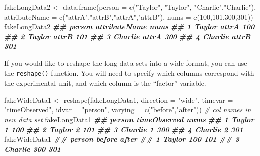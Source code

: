 \documentclass[
  12pt,
  krantz2]{krantz}
\makeatletter
\newenvironment{Shaded}{\begin{snugshade}}{\end{snugshade}}
\newcommand{\AttributeTok}[1]{\textcolor[rgb]{0.61,0.61,0.61}{#1}}
\newcommand{\CommentTok}[1]{\textcolor[rgb]{0.37,0.37,0.37}{\textit{#1}}}
\newcommand{\DecValTok}[1]{\textcolor[rgb]{0.06,0.06,0.06}{#1}}
\newcommand{\DocumentationTok}[1]{\textcolor[rgb]{0.37,0.37,0.37}{\textbf{\textit{#1}}}}
\newcommand{\FunctionTok}[1]{\textcolor[rgb]{0,0,0}{#1}}
\newcommand{\NormalTok}[1]{#1}
\newcommand{\OtherTok}[1]{\textcolor[rgb]{0.37,0.37,0.37}{#1}}
\newcommand{\StringTok}[1]{\textcolor[rgb]{0.5,0.5,0.5}{#1}}
\newenvironment{kframe}{%
\medskip{}
\setlength{\fboxsep}{.8em}
 \def\at@end@of@kframe{}%
 \ifinner\ifhmode%
  \def\at@end@of@kframe{\end{minipage}}%
  \begin{minipage}{\columnwidth}%
 \fi\fi%
 \def\FrameCommand##1{\hskip\@totalleftmargin \hskip-\fboxsep
 \colorbox{shadecolor}{##1}\hskip-\fboxsep
     \hskip-\linewidth \hskip-\@totalleftmargin \hskip\columnwidth}%
 \MakeFramed {\advance\hsize-\width
   \@totalleftmargin\z@ \linewidth\hsize
   \@setminipage}}%
 {\par\unskip\endMakeFramed%
 \at@end@of@kframe}
\renewenvironment{Shaded}{\begin{kframe}}{\end{kframe}}
\makeatother
\begin{document}
\begin{Shaded}
\begin{Highlighting}[]
\NormalTok{fakeLongData2 }\OtherTok{\textless{}{-}} \FunctionTok{data.frame}\NormalTok{(}\AttributeTok{person =} \FunctionTok{c}\NormalTok{(}\StringTok{"Taylor"}\NormalTok{, }\StringTok{"Taylor"}\NormalTok{, }\StringTok{"Charlie"}\NormalTok{,}\StringTok{"Charlie"}\NormalTok{), }
                             \AttributeTok{attributeName =} \FunctionTok{c}\NormalTok{(}\StringTok{"attrA"}\NormalTok{,}\StringTok{"attrB"}\NormalTok{,}\StringTok{"attrA"}\NormalTok{,}\StringTok{"attrB"}\NormalTok{),}
                             \AttributeTok{nums =} \FunctionTok{c}\NormalTok{(}\DecValTok{100}\NormalTok{,}\DecValTok{101}\NormalTok{,}\DecValTok{300}\NormalTok{,}\DecValTok{301}\NormalTok{))}
\NormalTok{fakeLongData2}
\DocumentationTok{\#\#    person attributeName nums}
\DocumentationTok{\#\# 1  Taylor         attrA  100}
\DocumentationTok{\#\# 2  Taylor         attrB  101}
\DocumentationTok{\#\# 3 Charlie         attrA  300}
\DocumentationTok{\#\# 4 Charlie         attrB  301}
\end{Highlighting}
\end{Shaded}

If you would like to reshape the long data sets into a wide format, you can use the \texttt{reshape()} function. You will need to specify which columns correspond with the experimental unit, and which column is the ``factor'' variable.

\begin{Shaded}
\begin{Highlighting}[]
\NormalTok{fakeWideData1 }\OtherTok{\textless{}{-}} \FunctionTok{reshape}\NormalTok{(fakeLongData1, }
                           \AttributeTok{direction =} \StringTok{"wide"}\NormalTok{, }
                           \AttributeTok{timevar =} \StringTok{"timeObserved"}\NormalTok{, }
                           \AttributeTok{idvar =} \StringTok{"person"}\NormalTok{, }
                           \AttributeTok{varying =} \FunctionTok{c}\NormalTok{(}\StringTok{"before"}\NormalTok{,}\StringTok{"after"}\NormalTok{)) }\CommentTok{\# col names in new data set}
\NormalTok{fakeLongData1}
\DocumentationTok{\#\#    person timeObserved nums}
\DocumentationTok{\#\# 1  Taylor            1  100}
\DocumentationTok{\#\# 2  Taylor            2  101}
\DocumentationTok{\#\# 3 Charlie            1  300}
\DocumentationTok{\#\# 4 Charlie            2  301}
\NormalTok{fakeWideData1}
\DocumentationTok{\#\#    person before after}
\DocumentationTok{\#\# 1  Taylor    100   101}
\DocumentationTok{\#\# 3 Charlie    300   301}
\end{Highlighting}
\end{Shaded}
\end{document}
